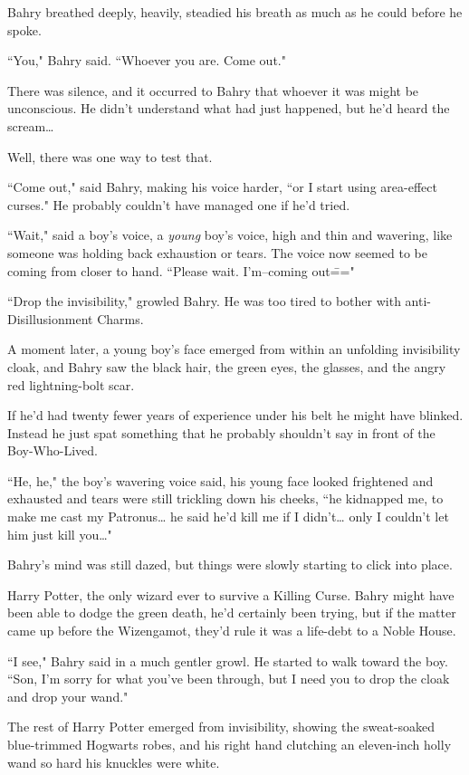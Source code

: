 Bahry breathed deeply, heavily, steadied his breath as much as he could before he spoke.

``You," Bahry said. ``Whoever you are. Come out."

There was silence, and it occurred to Bahry that whoever it was might be unconscious. He didn't understand what had just happened, but he'd heard the scream{\ldots}

Well, there was one way to test that.

``Come out," said Bahry, making his voice harder, ``or I start using area-effect curses." He probably couldn't have managed one if he'd tried.

``Wait," said a boy's voice, a \emph{young} boy's voice, high and thin and wavering, like someone was holding back exhaustion or tears. The voice now seemed to be coming from closer to hand. ``Please wait. I'm\---coming out\==="

``Drop the invisibility," growled Bahry. He was too tired to bother with anti-Disillusionment Charms.

A moment later, a young boy's face emerged from within an unfolding invisibility cloak, and Bahry saw the black hair, the green eyes, the glasses, and the angry red lightning-bolt scar.

If he'd had twenty fewer years of experience under his belt he might have blinked. Instead he just spat something that he probably shouldn't say in front of the Boy-Who-Lived.

``He, he," the boy's wavering voice said, his young face looked frightened and exhausted and tears were still trickling down his cheeks, ``he kidnapped me, to make me cast my Patronus{\ldots} he said he'd kill me if I didn't{\ldots} only I couldn't let him just kill you{\ldots}"

Bahry's mind was still dazed, but things were slowly starting to click into place.

Harry Potter, the only wizard ever to survive a Killing Curse. Bahry might have been able to dodge the green death, he'd certainly been trying, but if the matter came up before the Wizengamot, they'd rule it was a life-debt to a Noble House.

``I see," Bahry said in a much gentler growl. He started to walk toward the boy. ``Son, I'm sorry for what you've been through, but I need you to drop the cloak and drop your wand."

The rest of Harry Potter emerged from invisibility, showing the sweat-soaked blue-trimmed Hogwarts robes, and his right hand clutching an eleven-inch holly wand so hard his knuckles were white.

